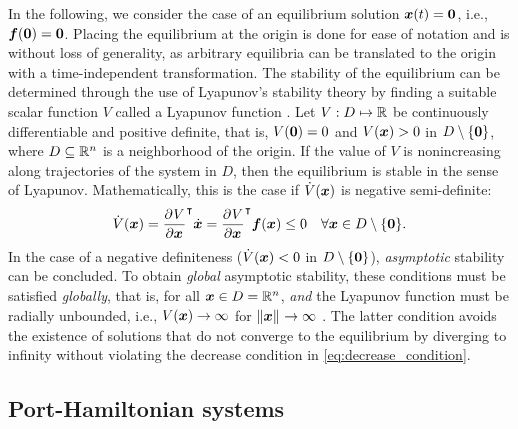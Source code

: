 In the following, we consider the case of an equilibrium solution $\boldsymbol{x}(t)=\boldsymbol{0}$, i.e., $\boldsymbol{f}(\boldsymbol{0})=\boldsymbol{0}$. Placing the equilibrium at the origin is done for ease of notation and is without loss of generality, as arbitrary equilibria can be translated to the origin with a time-independent transformation. 
The stability of the equilibrium can be determined through the use of Lyapunov's stability theory by finding a suitable scalar function $V$ called a Lyapunov function \cite{verhulst1990, khalil2002}. Let $V: D\mapsto{\mathbb{R}}$ be continuously differentiable and positive definite, that is, $V(\boldsymbol{0})=0$ and $ V(\boldsymbol{x}) > 0$ in $D\setminus\{\boldsymbol{0}\}$, where $D\subseteq{\mathbb{R}}^n$ is a neighborhood of the origin. If the value of $V$ is nonincreasing along trajectories of the system in $D$, then the equilibrium is stable in the sense of Lyapunov. Mathematically, this is the case if $\dot V(\boldsymbol{x})$ is negative semi-definite:
\begin{equation}\label{eq:decrease_condition}
    \dot V(\boldsymbol{x})=\frac{\partial^{}V}{\partial\boldsymbol{x}^{}}^{\intercal}\dot{\boldsymbol{x}} = \frac{\partial^{}V}{\partial\boldsymbol{x}^{}}^{\intercal}\boldsymbol{f}(\boldsymbol{x}) \leq0\quad\forall\boldsymbol{x}\in D\setminus\{\boldsymbol{0}\}.
\end{equation}
In the case of a negative definiteness ($\dot V(\boldsymbol{x})<0$ in $D\setminus\{\boldsymbol{0}\}$), \emph{asymptotic} stability can be concluded.
To obtain \emph{global} asymptotic stability, these conditions must be satisfied \emph{globally}, that is, for all ${\boldsymbol{x}\in D={\mathbb{R}}^n}$, \emph{and} the Lyapunov function must be radially unbounded, i.e., $V(\boldsymbol{x})\rightarrow\infty$ for $\left\lVert\boldsymbol{x}\right\rVert_{}\rightarrow\infty$ \cite{khalil2002}.
The latter condition avoids the existence of solutions that do not converge to the equilibrium by diverging to infinity without violating the decrease condition in \cref{eq:decrease_condition}.

\subsection{Port-Hamiltonian systems}\label{sec:phs}

